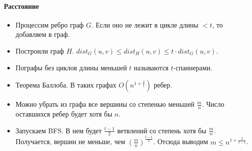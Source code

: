 \paragraph{Расстояние} %
\label{par:distance}

\begin{itemize}
	\item Процессим ребро граф $G$. Если оно не лежит в цикле длины $< t$, то добавляем в граф.
	\item Построили граф $H$. $dist_G(u, v) \leq dist_H(u, v) \leq t \cdot dist_G(u, v)$.
	\item Пографы без циклов длины меньшей $t$ называются $t$-спаннерами.
	\item Теорема Баллоба. В таких графах $O(n^{1 + \frac{2}{t}})$ ребер.
	\item Можно убрать из графа все вершины со степенью меньшей $\frac{m}{n}$. Число оставшихся ребер будет хотя бы $n$.
	\item Запускаем BFS. В нем будет $\frac{t - 1}{2}$ ветвлений со степень хотя бы $\frac{m}{n}$. Получается, вершин не меньше, чем $\left(\frac{m}{n}\right)^{\frac{t - 1}{2}}$. Отсюда выводим $m \leq n^{1 + \frac{2}{t - 1}}$.
\end{itemize}


